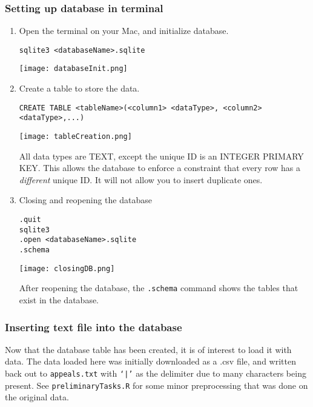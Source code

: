 \documentclass{article}
\begin{document}
\subsubsection{Setting up database in terminal}
\begin{enumerate}
\item Open the terminal on your Mac, and initialize database.
\begin{verbatim}
sqlite3 <databaseName>.sqlite
\end{verbatim}
\begin{center}
\texttt{[image: databaseInit.png]}
\end{center}
\item Create a table to store the data. 
\begin{verbatim}
CREATE TABLE <tableName>(<column1> <dataType>, <column2> <dataType>,...)
\end{verbatim}
\begin{center}
\texttt{[image: tableCreation.png]}
\end{center}
All data types are TEXT, except the unique ID is an INTEGER PRIMARY KEY. This allows the database to enforce a constraint that every row has a {\it different} unique ID. It will not allow you to insert duplicate ones.
\item Closing and reopening the database
\begin{verbatim}
.quit
sqlite3
.open <databaseName>.sqlite
.schema
\end{verbatim}
\begin{center}
\texttt{[image: closingDB.png]}
\end{center}
After reopening the database, the {\tt .schema} command shows the tables that exist in the database.
\end{enumerate}

\subsubsection{Inserting text file into the database}
Now that the database table has been created, it is of interest to load it with data. The data loaded here was initially downloaded as a .csv file, and written back out to {\tt appeals.txt} with {\tt `|'} as the delimiter due to many characters being present. See {\tt preliminaryTasks.R} for some minor preprocessing that was done on the original data.
\end{document}
